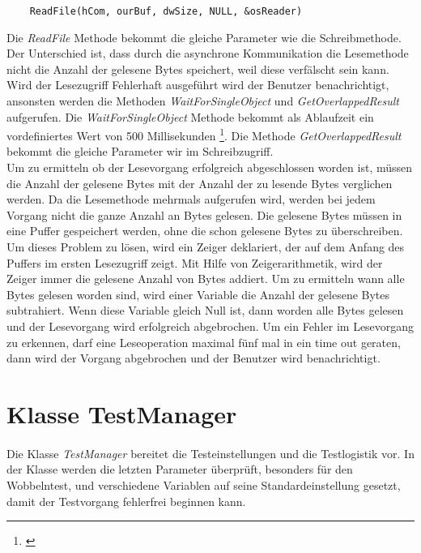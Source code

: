 \begin{lstlisting}
	ReadFile(hCom, ourBuf, dwSize, NULL, &osReader)
\end{lstlisting}

Die \textit{ReadFile} Methode bekommt die gleiche Parameter wie die Schreibmethode. Der Unterschied ist, dass durch die asynchrone Kommunikation die Lesemethode nicht die Anzahl der gelesene Bytes speichert, weil diese verfälscht sein kann. Wird der Lesezugriff Fehlerhaft ausgeführt wird der Benutzer benachrichtigt, ansonsten werden die Methoden \textit{WaitForSingleObject} und \textit{GetOverlappedResult} aufgerufen. Die \textit{WaitForSingleObject} Methode bekommt als Ablaufzeit ein vordefiniertes Wert von 500 Millisekunden \footnote{\cite{SerialCommunications}}. Die Methode \textit{GetOverlappedResult} bekommt die gleiche Parameter wir im Schreibzugriff.\\

Um zu ermitteln ob der Lesevorgang erfolgreich abgeschlossen worden ist, müssen die Anzahl der gelesene Bytes mit der Anzahl der zu lesende Bytes verglichen werden. Da die Lesemethode mehrmals aufgerufen wird, werden bei jedem Vorgang nicht die ganze Anzahl an Bytes gelesen. Die gelesene Bytes müssen in eine Puffer gespeichert werden, ohne die schon gelesene Bytes zu überschreiben. Um dieses Problem zu lösen, wird ein Zeiger deklariert, der auf dem Anfang des Puffers im ersten Lesezugriff zeigt. Mit Hilfe von Zeigerarithmetik, wird der Zeiger immer die gelesene Anzahl von Bytes addiert. Um zu ermitteln wann alle Bytes gelesen worden sind, wird einer Variable die Anzahl der gelesene Bytes subtrahiert. Wenn diese Variable gleich Null ist, dann worden alle Bytes gelesen und der Lesevorgang wird erfolgreich abgebrochen. Um ein Fehler im Lesevorgang zu erkennen, darf eine Leseoperation maximal fünf mal in ein time out geraten, dann wird der Vorgang abgebrochen und der Benutzer wird benachrichtigt.



\newpage


\section{Klasse TestManager}
\paragraph{}
Die Klasse \textit{TestManager} bereitet die Testeinstellungen und die Testlogistik vor. In der Klasse werden die letzten Parameter überprüft, besonders für den Wobbelntest, und verschiedene Variablen auf seine Standardeinstellung gesetzt, damit der Testvorgang fehlerfrei beginnen kann.


